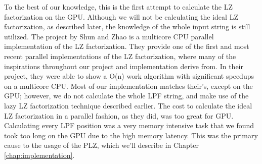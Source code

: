 To the best of our knowledge, this is the first attempt to calculate the LZ factorization on the GPU.
Although we will not be calculating the ideal LZ factorization, as described later, the knowledge of the whole input string is still utilized.
The project by Shun and Zhao \cite{shun2013practical} is a multicore CPU parallel implementation of the LZ factorization.
They provide one of the first and most recent parallel implementations of the LZ factorization, where many of the inspirations throughout our project and implementation derive from.
In their project, they were able to show a O(n) work algorithm with significant speedups on a multicore CPU.
Most of our implementation matches their's, except on the GPU; however, we do not calculate the whole LPF string, and make use of the lazy LZ factorization technique described earlier.
The cost to calculate the ideal LZ factorization in a parallel fashion, as they did, was too great for GPU.
Calculating every LPF position was a very memory intensive task that we found took too long on the GPU due to the high memory latency.
This was the primary cause to the usage of the PLZ, which we'll describe in Chapter \ref{chap:implementation}.



